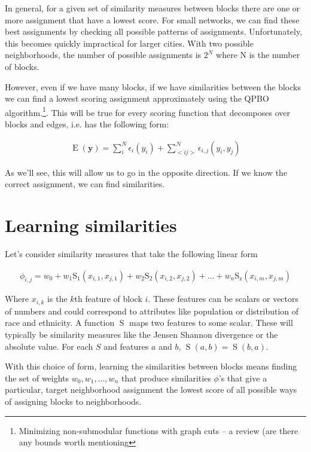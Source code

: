

In general, for a given set of similarity measures between blocks
there are one or more assignment that have a lowest score. For small
networks, we can find these best assignments by checking all possible
patterns of assignments. Unfortunately, this becomes quickly
impractical for larger cities. With two possible neighborhoods, the
number of possible assignments is $2^N$ where N is the number of
blocks.

However, even if we have many blocks, if we have similarities
between the blocks we can find a lowest scoring assignment
approximately using the QPBO algorithm.\footnote{Minimizing
  non-submodular functions with graph cuts – a review (are there any
  bounds worth mentioning}. This will be true for every scoring
function that decomposes over blocks and edges, i.e. has the following
form:

\begin{align}
\operatorname{E}(\mathbf{y}) = \sum_i^N\epsilon_i(y_i) + \sum_{<i j>}^{\mathcal{N}}\epsilon_{i,j}(y_i,y_j)
\end{align}



As we'll see, this will allow us to go in
the opposite direction. If we know the correct assignment, we can find
similarities.

\section*{Learning similarities}
Let's consider similarity measures that take the following linear form

\begin{align}
\phi_{i,j} = w_0 + w_1\operatorname{S_1}(x_{i,1}, x_{j,1}) +
w_2\operatorname{S_2}(x_{i,2}, x_{j,2}) + ... +
w_n\operatorname{S_z}(x_{i,m},x_{j,m})
\end{align} 

Where $x_{i,k}$ is the $k$th feature of block $i$. These
features can be scalars or vectors of numbers and could correspond to
attributes like population or distribution of race and ethnicity. A
function $\operatorname{S}$ maps two features to some scalar. These
will typically be similarity measures like the Jensen Shannon
divergence or the absolute value. For each $S$ and features $a$ and
$b$, $\operatorname{S}(a,b) = \operatorname{S}(b,a)$.

With this choice of form, learning the similarities between blocks
means finding the set of weights $w_0, w_1, ..., w_n$ that produce
similarities $\phi$'s that give a particular, target neighborhood
assignment the lowest score of all possible ways of assigning blocks
to neighborhoods. 

